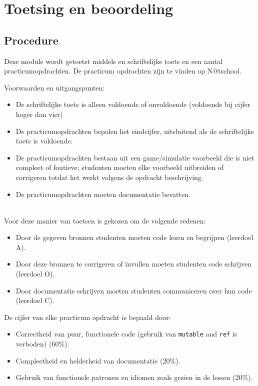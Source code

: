 \section{Toetsing en beoordeling}
	\subsection{Procedure}
		Deze module wordt getoetst middels en schriftelijke toets en een aantal practicumopdrachten. De practicum opdrachten zijn te vinden op N@tschool.

		Voorwaarden en uitgangspunten:
		\begin{itemize}
			\item De schriftelijke toets is alleen voldoende of onvoldoende (voldoende bij cijfer hoger dan vier)
			\item De practicumopdrachten bepalen het eindcijfer, uitsluitend als de schriftelijke toets is voldoende.
			\item De practicumopdrachten bestaan uit een game/simulatie voorbeeld die is niet compleet of foutieve; studenten moeten elke voorbeeld uitbreiden of corrigeren totdat het werkt volgens de opdracht beschrijving.
			\item De practicumopdrachten moeten documentatie bevatten.
		\end{itemize}
		\ \\
		
		Voor deze manier van toetsen is gekozen om de volgende redenen:
		\begin{itemize}
			\item Door de gegeven bronnen studenten moeten code lezen en begrijpen (leerdoel A).
			\item Door deze bronnen te corrigeren of invullen moeten studenten code schrijven (leerdoel O).
			\item Door documentatie schrijven moeten studenten communiceren over hun code (leerdoel C).
		\end{itemize}

		De cijfer van elke practicum opdracht is bepaald door:
		\begin{itemize}
			\item Correctheid van puur, functionele code (gebruik van \texttt{mutable} and \texttt{ref} is verboden) (60\%).
			\item Compleetheid en helderheid van documentatie (20\%).
			\item Gebruik van functionele patronen en idiomen zoals gezien in de lessen (20\%).
		\end{itemize}

